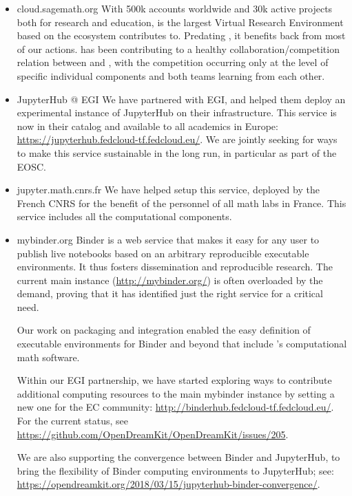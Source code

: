 \begin{itemize}
\item{cloud.sagemath.org} With 500k accounts worldwide and 30k active
  projects both for research and education, \SMC is the largest
  Virtual Research Environment based on the ecosystem \ODK contributes
  to. Predating \ODK, it benefits back from most of our actions. \ODK
  has been contributing to a healthy collaboration/competition
  relation between \JupyterHub and \SMC, with the competition
  occurring only at the level of specific individual components and
  both teams learning from each other.

\item{JupyterHub @ EGI} We have partnered with EGI, and helped them
  deploy an experimental instance of JupyterHub on their
  infrastructure. This service is now in their catalog and available
  to all academics in Europe:
  \url{https://jupyterhub.fedcloud-tf.fedcloud.eu/}. We are jointly
  seeking for ways to make this service sustainable in the long run,
  in particular as part of the EOSC.

\item{jupyter.math.cnrs.fr} We have helped setup this \JupyterHub
  service, deployed by the French CNRS for the benefit of the
  personnel of all math labs in France. This service includes all the
  \ODK computational components.

\item{mybinder.org} Binder is a web service that makes it easy for any
  user to publish live notebooks based on an arbitrary reproducible
  executable environments. It thus fosters dissemination and
  reproducible research. The current main instance
  (\url{http://mybinder.org/}) is often overloaded by the demand,
  proving that it has identified just the right service for a critical
  need.

  Our work on packaging
   and \Jupyter
  integration  enabled the easy
  definition of executable environments for Binder and beyond that
  include \ODK's computational math software.

  Within our EGI partnership, we have started exploring ways to
  contribute additional computing resources to the main mybinder
  instance by setting a new one for the EC community:
  \url{http://binderhub.fedcloud-tf.fedcloud.eu/}.
  For the current status, see
  \url{https://github.com/OpenDreamKit/OpenDreamKit/issues/205}.

  We are also supporting the convergence between Binder and
  JupyterHub, to bring the flexibility of Binder computing
  environments to JupyterHub; see:
  \url{https://opendreamkit.org/2018/03/15/jupyterhub-binder-convergence/}.


\end{itemize}

